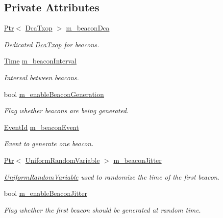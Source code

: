 \subsection*{Private Attributes}
\begin{DoxyCompactItemize}
\item 
\hyperlink{classns3_1_1Ptr}{Ptr}$<$ \hyperlink{classns3_1_1DcaTxop}{Dca\+Txop} $>$ \hyperlink{classns3_1_1ApWifiMac_a5eb69e654f0897d16c71e96bf168784d}{m\+\_\+beacon\+Dca}
\begin{DoxyCompactList}\small\item\em Dedicated \hyperlink{classns3_1_1DcaTxop}{Dca\+Txop} for beacons. \end{DoxyCompactList}\item 
\hyperlink{classns3_1_1Time}{Time} \hyperlink{classns3_1_1ApWifiMac_a798e9c63c2c85d0973fd1456ffdd38e3}{m\+\_\+beacon\+Interval}
\begin{DoxyCompactList}\small\item\em Interval between beacons. \end{DoxyCompactList}\item 
bool \hyperlink{classns3_1_1ApWifiMac_a783d01de4969a1227232246d82ce1ce9}{m\+\_\+enable\+Beacon\+Generation}
\begin{DoxyCompactList}\small\item\em Flag whether beacons are being generated. \end{DoxyCompactList}\item 
\hyperlink{classns3_1_1EventId}{Event\+Id} \hyperlink{classns3_1_1ApWifiMac_a9ba5983f49f1c44c2623ace4e463d3a0}{m\+\_\+beacon\+Event}
\begin{DoxyCompactList}\small\item\em Event to generate one beacon. \end{DoxyCompactList}\item 
\hyperlink{classns3_1_1Ptr}{Ptr}$<$ \hyperlink{classns3_1_1UniformRandomVariable}{Uniform\+Random\+Variable} $>$ \hyperlink{classns3_1_1ApWifiMac_a319661e15bf89aedd0e0a3494195d055}{m\+\_\+beacon\+Jitter}
\begin{DoxyCompactList}\small\item\em \hyperlink{classns3_1_1UniformRandomVariable}{Uniform\+Random\+Variable} used to randomize the time of the first beacon. \end{DoxyCompactList}\item 
bool \hyperlink{classns3_1_1ApWifiMac_a803812db18b44720f24e48140e0f0c1e}{m\+\_\+enable\+Beacon\+Jitter}
\begin{DoxyCompactList}\small\item\em Flag whether the first beacon should be generated at random time. \end{DoxyCompactList}\item 

\end{DoxyCompactItemize}
